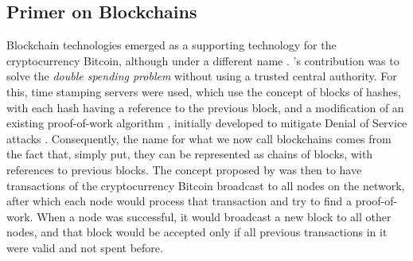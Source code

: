 \subsection{Primer on Blockchains}

Blockchain technologies emerged as a supporting technology for the cryptocurrency Bitcoin, although under a different name \cite{nakamoto_bitcoin:_2008}. \citeauthor{nakamoto_bitcoin:_2008}'s contribution was to solve the \textit{double spending problem} without using a trusted central authority. For this, time stamping servers were used, which use the concept of blocks of hashes, with each hash having a reference to the previous block, and a modification of an existing proof-of-work algorithm \cite{back_hashcash_2002}, initially developed to mitigate Denial of Service attacks \cite[1]{back_hashcash_2002}. Consequently, the name for what we now call blockchains comes from the fact that, simply put, they can be represented as chains of blocks, with references to previous blocks. The concept proposed by \citeauthor{nakamoto_bitcoin:_2008} \cite{nakamoto_bitcoin:_2008} was then to have transactions of the cryptocurrency Bitcoin broadcast to all nodes on the network, after which each node would process that transaction and try to find a proof-of-work. When a node was successful, it would broadcast a new block to all other nodes, and that block would be accepted only if all previous transactions in it were valid and not spent before.

